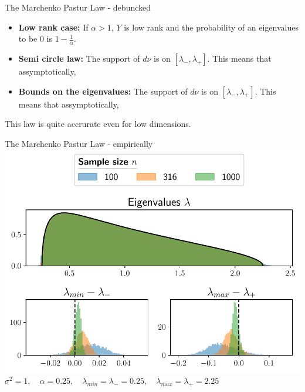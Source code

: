 \documentclass{beamer}
\begin{document}
    \begin{frame}{The Marchenko Pastur Law - debuncked}


        \begin{itemize}
            \item \textbf{Low rank case:} If $\alpha > 1$, $Y$ is low rank and the probability of an eigenvalues to be 0 is $1 - \frac1\alpha$.\\[1em]
            \item \textbf{Semi circle law:} The support of $d\nu$ is on $[\lambda_-, \lambda_+]$. This means that assymptotically,
            \item \textbf{Bounds on the eigenvalues:} The support of $d\nu$ is on $[\lambda_-, \lambda_+]$. This means that assymptotically,
        \end{itemize}
        This law is quite accrurate even for low dimensions.

    \end{frame}

    \begin{frame}{The Marchenko Pastur Law - empirically}
        \centering
        \includegraphics[width=.8\textwidth]{marchenko_pastur_alpha=0.25.pdf}\\[.5em]
        $\sigma^2=1, \quad\alpha = 0.25, \quad \lambda_{min} = \lambda_- = 0.25, \quad \lambda_{max} = \lambda_+ = 2.25$\\

    \end{frame}
\end{document}
